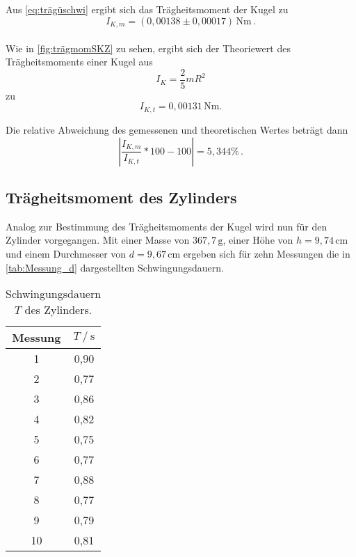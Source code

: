 Aus \eqref{eq:trägüschwi} ergibt sich das Trägheitsmoment der Kugel zu
\begin{equation*}
  I_{K,m} = (0,00138 \pm 0,00017)\, \unit{\newton\meter}  \, .
\end{equation*} \\

Wie in \autoref{fig:trägmomSKZ} zu sehen, ergibt sich der Theoriewert des Trägheitsmoments einer Kugel aus
\begin{equation}
  I_{K} = \frac{2}{5} m R^2
  \label{trägheitsmomK}
\end{equation}
zu
\begin{equation*}
  I_{K,t} = 0,00131 \, \unit{\newton\meter}. %
\end{equation*}

Die relative Abweichung des gemessenen und theoretischen Wertes beträgt dann
\begin{equation*}
  \left|\frac{I_{K,m}}{I_{K,t}} * 100 - 100 \right| = 5,344 \% \,.
\end{equation*}



\subsection{Trägheitsmoment des Zylinders}
\label{subsec:d}

Analog zur Bestimmung des Trägheitsmoments der Kugel wird nun für den Zylinder vorgegangen. Mit einer Masse von $367,7 \,\unit{\gram}$, einer Höhe von $h = 9,74 \,\unit{\centi\meter}$
und einem Durchmesser von $d = 9,67 \,\unit{\centi\meter}$ ergeben sich für zehn Messungen die in \autoref{tab:Messung_d} dargestellten Schwingungsdauern.

\begin{table}[H]
  \centering
  \begin{tabular}{S[table-format=2.0] S[table-format=1.2]}
      \toprule
      {Messung} & {$T \mathbin{/} \unit{\second}$}\\
        & 0,90 \\
          2  & 0,77 \\
          3  & 0,86 \\
          4  & 0,82 \\  
          5  & 0,75 \\
          6  & 0,77 \\
          7  & 0,88 \\
          8  & 0,77 \\
          9  & 0,79 \\
          10 & 0,81 \\
      \bottomrule
  \end{tabular}
  \caption{Schwingungsdauern $T$ des Zylinders.}
  \label{tab:Messung_d}
\end{table}

